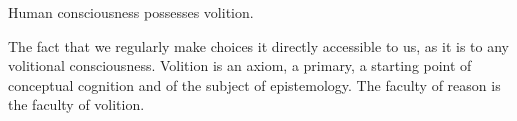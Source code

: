             \begin{corollary}[Volition]
                Human consciousness possesses volition.
            \end{corollary}

        The fact that we regularly make choices it directly accessible to us, as it is to any volitional consciousness. Volition is an axiom, a primary, a starting point of conceptual cognition and of the subject of epistemology. The faculty of reason is the faculty of volition.
